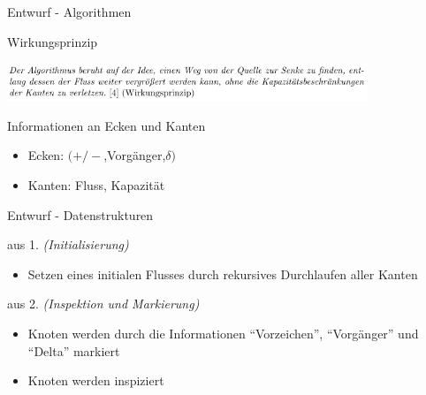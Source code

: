 \documentclass{beamer}
\begin{document}
    \begin{frame}{Entwurf - Algorithmen}
        \begin{block}{Wirkungsprinzip}
            \begin{center}
                \includegraphics[width=10.8cm]{../wirkungsprinzip.PNG}
            \end{center}
        \end{block}

        \begin{block}{Informationen an Ecken und Kanten}
            \begin{itemize}
                \item Ecken: $(+/-$,Vorg\"anger,$\delta)$
                \item Kanten: Fluss, Kapazit\"at
            \end{itemize}
        \end{block}
    \end{frame}

    \begin{frame}{Entwurf - Datenstrukturen}
        \begin{block}{aus 1. \textit{(Initialisierung)}}
            \begin{itemize}
                \item Setzen eines initialen Flusses durch rekursives Durchlaufen aller Kanten
            \end{itemize}
        \end{block}
        \begin{block}{aus 2. \textit{(Inspektion und Markierung)}}
            \begin{itemize}
                \item Knoten werden durch die Informationen "`Vorzeichen"', "`Vorg\"anger"' und "`Delta"' markiert
                \item Knoten werden inspiziert
            \end{itemize}
        \end{block}
    \end{frame}
\end{document}
